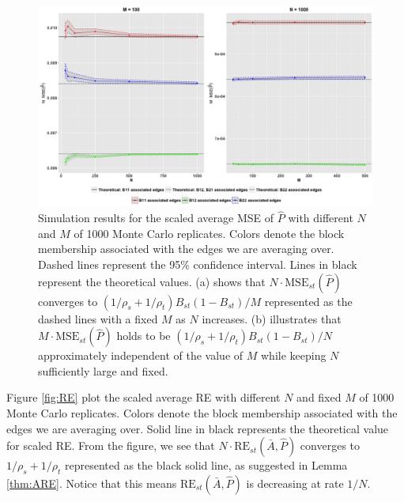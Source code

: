 \begin{figure}[!htb]
\centering
\includegraphics[width=16cm]{MSE.png}
\caption{Simulation results for the scaled average MSE of $\hat{P}$ with different $N$ and $M$ of 1000 Monte Carlo replicates. Colors denote the block membership associated with the edges we are averaging over. Dashed lines represent the 95\% confidence interval. Lines in black represent the theoretical values.
 (a) shows that $N \cdot \mathrm{MSE}_{st}(\hat{P})$ converges to $(1/\rho_s + 1/\rho_t) B_{st}(1-B_{st}) / M$ represented as the dashed lines with a fixed $M$ as $N$ increases.
 (b) illustrates that $M \cdot \mathrm{MSE}_{st}(\hat{P})$ holds to be $(1/\rho_s + 1/\rho_t) B_{st}(1-B_{st}) / N$ approximately independent of the value of $M$ while keeping $N$ sufficiently large and fixed.}
\label{fig:MSE}
\end{figure}




Figure \ref{fig:RE} plot the scaled average RE with different $N$ and fixed $M$ of 1000 Monte Carlo replicates. Colors denote the block membership associated with the edges we are averaging over. Solid line in black represents the theoretical value for scaled RE. From the figure, we see that $N \cdot \mathrm{RE}_{st}(\bar{A}, \hat{P})$ converges to $1/\rho_s + 1/\rho_t$ represented as the black solid line, as suggested in Lemma \ref{thm:ARE}. Notice that this means $\mathrm{RE}_{st}(\bar{A}, \hat{P})$ is decreasing at rate $1/N$.


